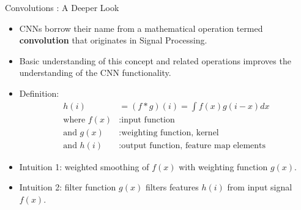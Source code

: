 \documentclass[11pt,compress,t,notes=noshow, xcolor=table]{beamer}
\begin{document}

\begin{vbframe}{Convolutions : A Deeper Look}
    \begin{itemize}
        \item CNNs borrow their name from a mathematical operation termed \textbf{convolution} that originates in Signal Processing.
        \item Basic understanding of this concept and related operations improves the understanding of the CNN functionality.
    \end{itemize}
\framebreak
    \begin{itemize}
        \item Definition: \\
            \begin{equation*}
                \begin{split}
                    h(i) &= (f \ast g)(i) = \int f(x)g(i-x)dx \\
                    \text{where } f(x)&: \text{input function} \\
                    \text{and } g(x)&: \text{weighting function, kernel} \\
                    \text{and } h(i)&: \text{output function, feature map elements}
                \end{split}
            \end{equation*}
        \item Intuition 1: weighted smoothing of $f(x)$ with weighting function $g(x)$. 
        \item Intuition 2: filter function $g(x)$ filters features $h(i)$ from input signal $f(x)$.
    \end{itemize}
\end{vbframe}    
\end{document}
